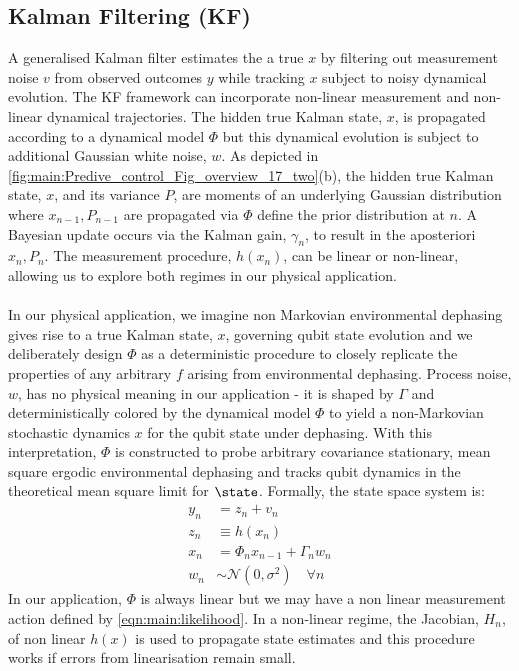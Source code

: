 \subsection{ Kalman Filtering (KF)}
A generalised Kalman filter estimates the a true $x$ by filtering out measurement noise $v$ from observed outcomes $y$ while tracking $x$ subject to noisy dynamical evolution. The KF framework can incorporate non-linear measurement and non-linear dynamical trajectories. The hidden true Kalman state, $x$, is propagated according to a dynamical model $\Phi$ but this dynamical evolution is subject to additional Gaussian white noise, $w$. As depicted in \cref{fig:main:Predive_control_Fig_overview_17_two}(b), the hidden true Kalman state, $x$, and its variance $P$, are moments of an underlying Gaussian distribution where $x_{n-1}, P_{n-1}$  are propagated via $\Phi$ define the prior distribution at $n$. A Bayesian update occurs via the Kalman gain, $\gamma_n$, to result in the aposteriori $x_{n}, P_{n}$. The measurement procedure, $h(x_n)$, can be linear or non-linear, allowing us to explore both regimes in our physical application.
\\
\\
In our physical application, we imagine non Markovian environmental dephasing gives rise to a true Kalman state, $x$, governing qubit state evolution and we deliberately design $\Phi$ as a deterministic procedure to closely replicate the properties of any arbitrary $f$ arising from environmental dephasing. Process noise, $w$, has no physical meaning in our application - it is shaped by $\Gamma$ and deterministically colored by the dynamical model $\Phi$ to yield a non-Markovian stochastic dynamics $x$ for the qubit state under dephasing. With this interpretation, $\Phi$ is constructed to probe arbitrary covariance stationary, mean square ergodic environmental dephasing and tracks qubit dynamics in the theoretical mean square limit for $\state$. Formally, the state space system is:
\begin{align}
y_n &= z_n + v_n \\
z_n & \equiv  h(x_n) \\
x_n & = \Phi_n x_{n-1} + \Gamma_n w_n \label{eqn:KF:dynamics} \\
w_n & \sim \mathcal{N}(0, \sigma^2) \quad \forall n 
\end{align}
In our application, $\Phi$  is always linear but we may have a non linear measurement action defined by \cref{eqn:main:likelihood}. In a non-linear regime, the Jacobian, $H_n$, of non linear  $h(x)$ is used to propagate state estimates and this procedure works if errors from linearisation remain small.
